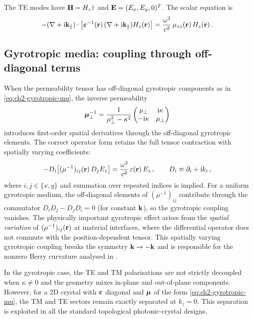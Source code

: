 The TE modes have $\mathbf{H}=H_z\hat{z}$ and
$\mathbf{E}=(E_x,E_y,0)^T$.  The scalar equation is
\begin{equation}\label{eq:ch4-te-scalar}
  -(\nabla+\mathrm{i}\mathbf{k}_\parallel)\cdot\bigl[
    \boldsymbol{\varepsilon}^{-1}(\mathbf{r})\,(\nabla+\mathrm{i}\mathbf{k}_\parallel)H_z(\mathbf{r})
  \bigr]
  = \frac{\omega^2}{c^2}\,\mu_{zz}(\mathbf{r})\,H_z(\mathbf{r})\,.
\end{equation}

\subsection{Gyrotropic media: coupling through off-diagonal terms}
\label{sec:ch4-gyrotropic}

When the permeability tensor has off-diagonal gyrotropic components as
in \eqref{eq:ch2-gyrotropic-mu}, the inverse permeability
\begin{equation}\label{eq:ch4-mu-inv}
  \boldsymbol{\mu}_\perp^{-1}
  = \frac{1}{\mu_\perp^2-\kappa^2}
  \begin{pmatrix}
    \mu_\perp & \mathrm{i}\kappa \\
    -\mathrm{i}\kappa & \mu_\perp
  \end{pmatrix}
\end{equation}
introduces first-order spatial derivatives through the off-diagonal
gyrotropic elements.  The correct operator form retains the full
tensor contraction with spatially varying coefficients:
\begin{equation}\label{eq:ch4-tm-gyrotropic}
  -D_i\bigl[(\mu^{-1})_{ij}(\mathbf{r})\,D_j E_z\bigr]
  = \frac{\omega^2}{c^2}\,\varepsilon(\mathbf{r})\,E_z\,,
  \qquad D_i\equiv\partial_i+\mathrm{i} k_i\,,
\end{equation}
where $i,j\in\{x,y\}$ and summation over repeated indices is implied.
For a uniform gyrotropic medium, the off-diagonal elements of
$(\mu^{-1})_{ij}$ contribute through the commutator
$D_i D_j - D_j D_i=0$ (for constant $\mathbf{k}$), so the gyrotropic
coupling vanishes.  The physically important gyrotropic effect arises
from the \emph{spatial variation} of $(\mu^{-1})_{ij}(\mathbf{r})$ at
material interfaces, where the differential operator does not commute
with the position-dependent tensor.  This spatially varying gyrotropic
coupling breaks the symmetry $\mathbf{k}\to-\mathbf{k}$ and is responsible for
the nonzero Berry curvature analysed in .

\begin{remark}
In the gyrotropic case, the TE and TM polarisations are not strictly
decoupled when $\kappa\neq 0$ and the geometry mixes in-plane and
out-of-plane components.  However, for a 2D crystal with
$\boldsymbol{\varepsilon}$ diagonal and $\boldsymbol{\mu}$ of the form
\eqref{eq:ch2-gyrotropic-mu}, the TM and TE sectors remain
exactly separated at $k_z=0$.  This separation is exploited in all the
standard topological photonic-crystal designs.
\end{remark}

